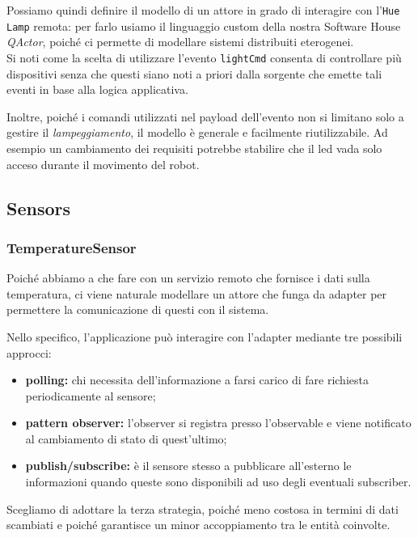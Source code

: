 \documentclass{../llncs}
\newcommand{\codescript}[1]{{\mbox{\small{\texttt{#1}}}}\xspace}
\newcommand{\qa}{\textsf{\textit{QActor}}}
\begin{document}
Possiamo quindi definire il modello di un attore in grado di interagire con l'\texttt{Hue Lamp} remota: per farlo usiamo il linguaggio custom della nostra Software House \qa, poiché ci permette di modellare sistemi distribuiti eterogenei.\\



Si noti come la scelta di utilizzare l'evento \codescript{lightCmd} consenta di controllare più dispositivi senza che questi siano noti a priori dalla sorgente che emette tali eventi in base alla logica applicativa.

Inoltre, poiché i comandi utilizzati nel payload dell'evento non si limitano solo a gestire il \textit{lampeggiamento}, il modello è generale e facilmente riutilizzabile. Ad esempio un cambiamento dei requisiti potrebbe stabilire che il led vada solo acceso durante il movimento del robot.

\subsection{Sensors}

\subsubsection{TemperatureSensor}
Poiché abbiamo a che fare con un servizio remoto che fornisce i dati sulla temperatura, ci viene naturale modellare un attore che funga da adapter per permettere la comunicazione di questi con il sistema.

Nello specifico, l'applicazione può interagire con l'adapter mediante tre possibili approcci:
\begin{itemize}
\item \textbf{polling:} chi necessita dell'informazione a farsi carico di fare richiesta periodicamente al sensore;
\item \textbf{pattern observer:} l'observer si registra presso l'observable e viene notificato al cambiamento di stato di quest'ultimo;
\item \textbf{publish/subscribe:} è il sensore stesso a pubblicare all'esterno le informazioni quando queste sono disponibili ad uso degli eventuali subscriber.
\end{itemize}
Scegliamo di adottare la terza strategia, poiché meno costosa in termini di dati scambiati e poiché garantisce un minor accoppiamento tra le entità coinvolte.
\end{document}
